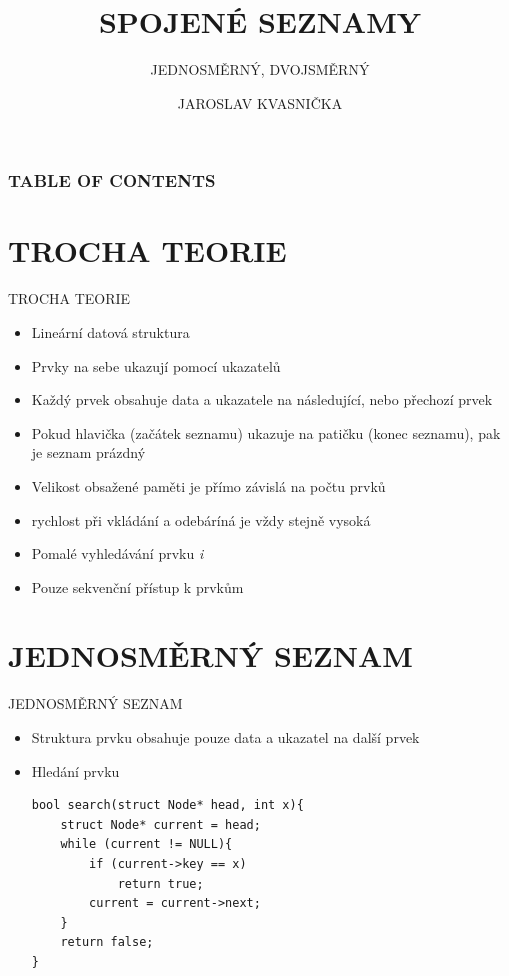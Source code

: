\documentclass[9pt]{beamer}
\title{SPOJENÉ SEZNAMY}
\subtitle{JEDNOSMĚRNÝ, DVOJSMĚRNÝ}
\author{JAROSLAV KVASNIČKA}
\institute{VYSOKÉ UČENÍ TECHNICKÉ V BRNĚ \\FAKULTA INFORMAČNÍCH TECHNOLOGIÍ}
\begin{document}
\titlepage


\begin{frame}
\frametitle{TABLE OF CONTENTS}
\tableofcontents
\end{frame}


\section{TROCHA TEORIE}
\begin{frame}{TROCHA TEORIE}
    \begin{itemize}
        \item Lineární datová struktura
        \item Prvky na sebe ukazují pomocí ukazatelů
        \item Každý prvek obsahuje data a ukazatele na následující, nebo přechozí prvek
        \item Pokud hlavička (začátek seznamu) ukazuje na patičku (konec seznamu), pak je seznam prázdný
    \end{itemize}
    \begin{itemize}
        \item Velikost obsažené paměti je přímo závislá na počtu prvků
        \item rychlost při vkládání a odebáríná je vždy stejně vysoká
    \end{itemize}
    \begin{itemize}
        \item Pomalé vyhledávání prvku \textit{i}
        \item Pouze sekvenční přístup k prvkům
    \end{itemize}
\end{frame}


\section{JEDNOSMĚRNÝ SEZNAM}
\begin{frame}[fragile]{JEDNOSMĚRNÝ SEZNAM}
\begin{figure}[h]
\end{figure}
\begin{itemize}
    \item Struktura prvku obsahuje pouze data a ukazatel na další prvek
    \item Hledání prvku
    \begin{lstlisting}
bool search(struct Node* head, int x){
    struct Node* current = head;
    while (current != NULL){
        if (current->key == x)
            return true;
        current = current->next;
    }
    return false;
}
    \end{lstlisting}
\end{itemize}
\end{frame}
\end{document}
